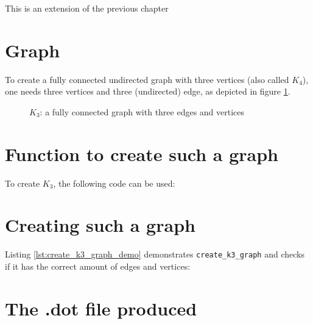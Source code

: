 This is an extension of the previous chapter

\section{Graph}

To create a fully connected undirected graph with three vertices 
(also called $K_{4}$), 
one needs three vertices and three (undirected) edge, 
as depicted in figure \ref{fig:create_k3_graph}.

\begin{figure}
  \caption{$K_{3}$: a fully connected graph with three edges and vertices }
  \label{fig:create_k3_graph}
\end{figure}

\section{Function to create such a graph}

To create $K_{3}$, the following code can be used:



\section{Creating such a graph}

Listing \ref{lst:create_k3_graph_demo} demonstrates 
\verb;create_k3_graph; and checks if it has the correct
amount of edges and vertices:



\section{The .dot file produced}
\label{subsec:create_k3_graph.dot}

